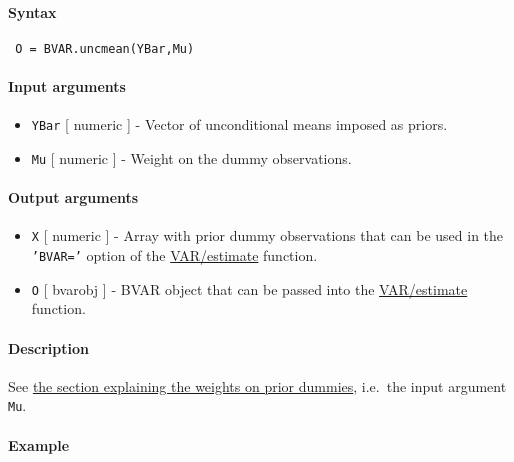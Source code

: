 


	\paragraph{Syntax}
 
 \begin{verbatim}
 O = BVAR.uncmean(YBar,Mu)
 \end{verbatim}
 
 \paragraph{Input arguments}
 
 \begin{itemize}
 \item
   \texttt{YBar} {[} numeric {]} - Vector of unconditional means imposed
   as priors.
 \item
   \texttt{Mu} {[} numeric {]} - Weight on the dummy observations.
 \end{itemize}
 
 \paragraph{Output arguments}
 
 \begin{itemize}
 \item
   \texttt{X} {[} numeric {]} - Array with prior dummy observations that
   can be used in the \texttt{'BVAR='} option of the \url{VAR/estimate}
   function.
 \item
   \texttt{O} {[} bvarobj {]} - BVAR object that can be passed into the
   \url{VAR/estimate} function.
 \end{itemize}
 
 \paragraph{Description}
 
 See \href{BVAR/Contents}{the section explaining the weights on prior
 dummies}, i.e.~the input argument \texttt{Mu}.
 
 \paragraph{Example}


